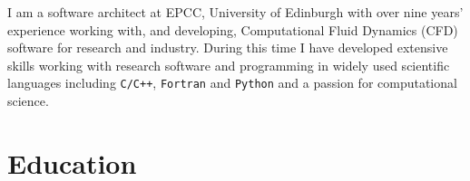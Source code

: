 \documentclass[10pt,a4paper]{moderncv} %
\begin{document}
\makecvtitle %
\vspace{-0.6cm}


I am a software architect at EPCC, University of Edinburgh with over nine years' experience
working with, and developing, Computational Fluid Dynamics (CFD) software for research and industry.
During this time I have developed extensive skills working with research software and programming in
widely used scientific languages including \texttt{C/C++}, \texttt{Fortran} and \texttt{Python} and
a passion for computational science.


\section{Education}
\end{document}
